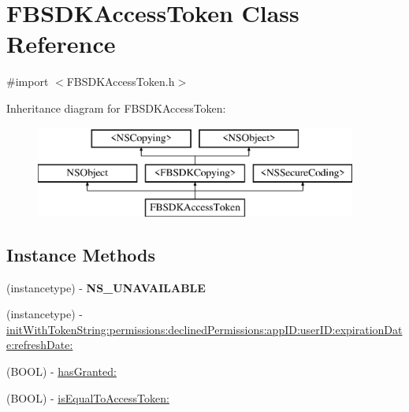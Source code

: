 \hypertarget{interface_f_b_s_d_k_access_token}{}\section{F\+B\+S\+D\+K\+Access\+Token Class Reference}
\label{interface_f_b_s_d_k_access_token}


{\ttfamily \#import $<$F\+B\+S\+D\+K\+Access\+Token.\+h$>$}

Inheritance diagram for F\+B\+S\+D\+K\+Access\+Token\+:\begin{figure}[H]
\begin{center}
\leavevmode
\includegraphics[height=3.000000cm]{interface_f_b_s_d_k_access_token}
\end{center}
\end{figure}
\subsection*{Instance Methods}
\begin{DoxyCompactItemize}
\item 
\hypertarget{interface_f_b_s_d_k_access_token_a73cc57476f065e08ede78124c5ed1ef1}{}(instancetype) -\/ {\bfseries N\+S\+\_\+\+U\+N\+A\+V\+A\+I\+L\+A\+B\+L\+E}\label{interface_f_b_s_d_k_access_token_a73cc57476f065e08ede78124c5ed1ef1}

\item 
(instancetype) -\/ \hyperlink{interface_f_b_s_d_k_access_token_ab498348bc81a7f9735316386a4e3f497}{init\+With\+Token\+String\+:permissions\+:declined\+Permissions\+:app\+I\+D\+:user\+I\+D\+:expiration\+Date\+:refresh\+Date\+:}
\item 
(B\+O\+O\+L) -\/ \hyperlink{interface_f_b_s_d_k_access_token_a5cb28a32a0b0598feaa4695e14751898}{has\+Granted\+:}
\item 
(B\+O\+O\+L) -\/ \hyperlink{interface_f_b_s_d_k_access_token_a08f16c50056958fc749ad372f74c0063}{is\+Equal\+To\+Access\+Token\+:}
\end{DoxyCompactItemize}
